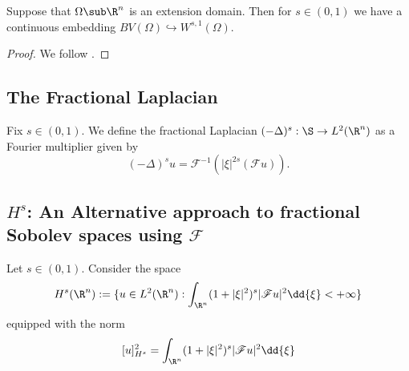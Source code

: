 \documentclass[../main.tex]{subfiles}
\begin{document}
\begin{proposition}\label{BVinWs}
    Suppose that $ \Omega\sub \R^{n} $ is an extension domain. Then for $ s\in (0,1) $ we have a continuous embedding $ BV(\Omega)\hookrightarrow W^{s,1}(\Omega) $.
\end{proposition}

\begin{proof}
    We follow \textcite{lobardini:2019}. 
\end{proof}


\subsection{The Fractional Laplacian}

\begin{definition}
    Fix $ s\in (0,1) $. We define the fractional Laplacian $ (-\Delta)^{s}:\S\to L^{2}(\R^{n}) $ as a Fourier multiplier given by
    \[
        (-\Delta)^{s}u = \mathscr{F}^{-1} (| \xi|^{2s}( \mathscr{F}u)).
    \]
\end{definition}

\subsection{$ H^{s} $: An Alternative approach to fractional Sobolev spaces using $ \mathscr{F} $}

\begin{definition}
    Let $ s\in (0,1) $. Consider the space
    \[
         H^{s}(\R^{n}) := \{ u\in L^{2}(\R^{n}): \int_{\R^{n}}(1+| \xi|^{2})^{s}|\mathscr{F}u|^{2}\dd{\xi} < +\infty\} 
    \]
    equipped with the norm
    \[
        [u]_{H^{s}}^{2} = \int_{\R^{n}}(1+| \xi|^{2})^{s}|\mathscr{F}u|^{2}\dd{\xi} 
    \]
\end{definition}
\end{document}
